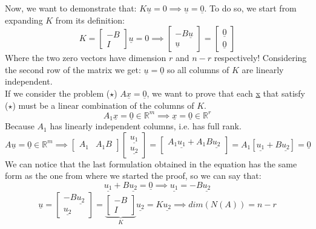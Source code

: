 Now, we want to demonstrate that: $K\underline{u} = 0 \implies \underline{u} = \underline{0}$. 
To do so, we start from expanding $K$ from its definition:
\[
    K = \begin{bmatrix}
        -B\\
        I
    \end{bmatrix}
    \underline{u} = 0
    \implies
    \begin{bmatrix}
        -B\underline{u}\\
        \underline{u}
    \end{bmatrix}
    = 
    \begin{bmatrix}
        \underline{0}\\
        \underline{0}
    \end{bmatrix}
\]
Where the two zero vectors have dimension $r$ and $n-r$ respectively! Considering the second row of the matrix we get: $\underline{u} = \underline{0}$ so all columns of $K$ are linearly independent.\\

If we consider the problem ($\star$) $A\underline{x} = \underline{0}$, we want to prove that each \underline{x} that satisfy ($\star$) must be a linear combination of the columns of $K$.\\
\[
    A_1\underline{x} = \underline{0} \in \mathbb{R}^m \implies \underline{x} = \underline{0} \in \mathbb{R}^r    
\]
Because $A_1$ has linearly independent columns, i.e. has full rank.
\[
    A\underline{u} = \underline{0} \in \mathbb{R}^m \implies \begin{bmatrix}
        A_1 & A_1B
    \end{bmatrix} 
    \begin{bmatrix}
        \underline{u_1}\\
        \underline{u_2}
    \end{bmatrix}  
    = 
    \begin{bmatrix}
        A_1\underline{u_1} + A_1B\underline{u_2}\\
    \end{bmatrix}
    = 
    A_1\left[\underline{u_1} + B\underline{u_2}\right]
    = \underline{0}
\]
We can notice that the last formulation obtained in the equation has the same form as the one from where we started the proof, so we can say that:
\[
    \underline{u_1} + B\underline{u_2} = \underline{0} \implies \underline{u_1} = -B\underline{u_2}    
\]
\[
   \underline{u} = \begin{bmatrix}
    -B\underline{u_2}\\
    \underline{u_2}
\end{bmatrix}
    =
\underbrace{\begin{bmatrix}
    -B\\
    I
\end{bmatrix}}_{K}
    \underline{u_2}
    = K\underline{u_2}
    \implies 
    dim(N(A)) = n - r
\]


